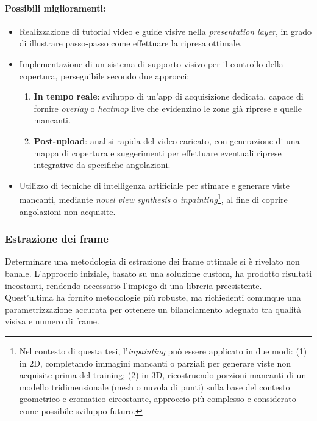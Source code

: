 \paragraph{Possibili miglioramenti:} 
\begin{itemize}
	\item Realizzazione di tutorial video e guide visive nella \emph{presentation layer}, in grado di illustrare passo-passo come effettuare la ripresa ottimale.
	\item Implementazione di un sistema di supporto visivo per il controllo della copertura, perseguibile secondo due approcci:
	\begin{enumerate}
		\item \textbf{In tempo reale}: sviluppo di un'app di acquisizione dedicata, capace di fornire \emph{overlay} o \emph{heatmap} live che evidenzino le zone già riprese e quelle mancanti.
		\item \textbf{Post-upload}: analisi rapida del video caricato, con generazione di una mappa di copertura e suggerimenti per effettuare eventuali riprese integrative da specifiche angolazioni.
	\end{enumerate}
	\item Utilizzo di tecniche di intelligenza artificiale per stimare e generare viste mancanti, mediante \emph{novel view synthesis} o \emph{inpainting}\footnote{Nel contesto di questa tesi, l'\emph{inpainting} può essere applicato in due modi: (1) in 2D, completando immagini mancanti o parziali per generare viste non acquisite prima del training; (2) in 3D, ricostruendo porzioni mancanti di un modello tridimensionale (mesh o nuvola di punti) sulla base del contesto geometrico e cromatico circostante, approccio più complesso e considerato come possibile sviluppo futuro.}, al fine di coprire angolazioni non acquisite.
	
\end{itemize}

\subsubsection{Estrazione dei frame}
Determinare una metodologia di estrazione dei frame ottimale si è rivelato non banale.  
L'approccio iniziale, basato su una soluzione custom, ha prodotto risultati incostanti, rendendo necessario l'impiego di una libreria preesistente.  
Quest'ultima ha fornito metodologie più robuste, ma richiedenti comunque una parametrizzazione accurata per ottenere un bilanciamento adeguato tra qualità visiva e numero di frame.


